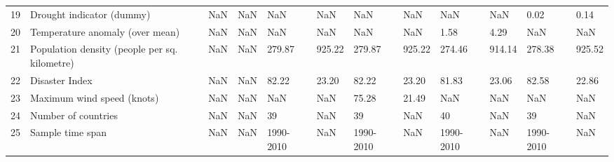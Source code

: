 \begin{tabular}{llllllllllll}
19 &                          Drought indicator (dummy) &          NaN &        NaN &              NaN &        NaN &              NaN &        NaN &                            NaN &        NaN &               0.02 &        0.14 \\
20 &                    Temperature anomaly (over mean) &          NaN &        NaN &              NaN &        NaN &              NaN &        NaN &                           1.58 &       4.29 &                NaN &         NaN \\
21 &      Population density (people per sq. kilometre) &          NaN &        NaN &           279.87 &     925.22 &           279.87 &     925.22 &                         274.46 &     914.14 &             278.38 &      925.52 \\
22 &                                     Disaster Index &          NaN &        NaN &            82.22 &      23.20 &            82.22 &      23.20 &                          81.83 &      23.06 &              82.58 &       22.86 \\
23 &                         Maximum wind speed (knots) &          NaN &        NaN &              NaN &        NaN &            75.28 &      21.49 &                            NaN &        NaN &                NaN &         NaN \\
24 &                                Number of countries &          NaN &        NaN &               39 &        NaN &               39 &        NaN &                             40 &        NaN &                 39 &         NaN \\
25 &                                   Sample time span &          NaN &        NaN &        1990-2010 &        NaN &        1990-2010 &        NaN &                      1990-2010 &        NaN &          1990-2010 &         NaN \\
\bottomrule
\end{tabular}
